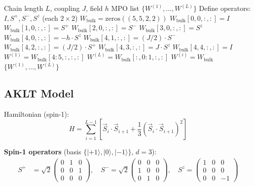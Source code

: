 \documentclass[aps,prb,onecolumn,scriptaddress]{revtex4-2}
\begin{document}
\begin{algorithm}[H]
\caption{BuildHeisenbergMPO}
\begin{algorithmic}[1]
	\Require Chain length $L$, coupling $J$, field $h$
				\Ensure MPO list $\{W^{(1)}, \ldots, W^{(L)}\}$
	\State Define operators: $I, S^+, S^-, S^z$ (each $2 \times 2$)
	\State $W_{\text{bulk}} = \text{zeros}((5, 5, 2, 2))$
	\State $W_{\text{bulk}}[0, 0, :, :] = I$
	\State $W_{\text{bulk}}[1, 0, :, :] = S^+$
	\State $W_{\text{bulk}}[2, 0, :, :] = S^-$
	\State $W_{\text{bulk}}[3, 0, :, :] = S^z$
	\State $W_{\text{bulk}}[4, 0, :, :] = -h \cdot S^z$
	\State $W_{\text{bulk}}[4, 1, :, :] = (J/2) \cdot S^-$
	\State $W_{\text{bulk}}[4, 2, :, :] = (J/2) \cdot S^+$
	\State $W_{\text{bulk}}[4, 3, :, :] = J \cdot S^z$
	\State $W_{\text{bulk}}[4, 4, :, :] = I$
	\State $W^{(1)} = W_{\text{bulk}}[4:5, :, :, :]$ 
	\State $W^{(L)} = W_{\text{bulk}}[:, 0:1, :, :]$ 
	\State $W^{(i)} = W_{\text{bulk}}$
	\EndFor
	\State \Return $\{W^{(1)}, \ldots, W^{(L)}\}$
	\end{algorithmic}
\end{algorithm}

\subsection{AKLT Model}

Hamiltonian (spin-1):
\begin{equation}
H = \sum_{i=1}^{L-1} \left[\vec{S}_i \cdot \vec{S}_{i+1} + \frac{1}{3}(\vec{S}_i \cdot \vec{S}_{i+1})^2\right]
\end{equation}

\textbf{Spin-1 operators} (basis $\{|{+}1\rangle, |0\rangle, |{-}1\rangle\}$, $d=3$):
\begin{align}
S^+ &= \sqrt{2}\begin{pmatrix} 0 & 1 & 0 \\ 0 & 0 & 1 \\ 0 & 0 & 0 \end{pmatrix}, \quad
S^- = \sqrt{2}\begin{pmatrix} 0 & 0 & 0 \\ 1 & 0 & 0 \\ 0 & 1 & 0 \end{pmatrix}, \quad
S^z = \begin{pmatrix} 1 & 0 & 0 \\ 0 & 0 & 0 \\ 0 & 0 & -1 \end{pmatrix}
\end{align}
\end{document}
